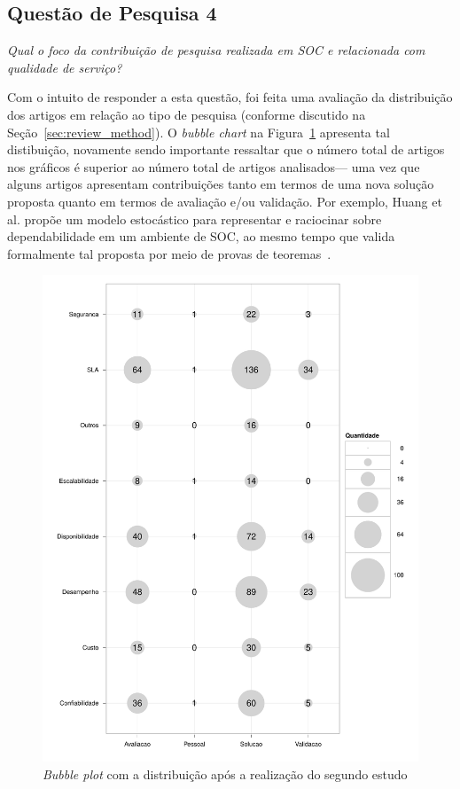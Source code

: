 \subsection{Questão de Pesquisa 4}

\emph{Qual o foco da contribuição de pesquisa realizada em SOC e relacionada com qualidade de serviço? }

Com o intuito de responder a esta questão, foi feita uma avalia\c c\~{a}o da distribui\c c\~{a}o dos 
artigos em rela\c c\~{a}o ao tipo de pesquisa (conforme discutido na Se\c c\~{a}o~\ref{sec:review_method}). 
O \emph{bubble chart} na Figura~\ref{fig:bubbleplot-QoSRes}  apresenta tal distibui\c c\~{a}o, novamente sendo importante ressaltar que o n\'{u}mero total de artigos nos gr\'{a}ficos \'{e} superior ao n\'{u}mero total de artigos analisados--- uma vez que alguns artigos apresentam contribui\c c\~{o}es tanto em termos de uma nova solu\c c\~{a}o proposta quanto em termos de avalia\c c\~{a}o e/ou valida\c c\~{a}o. Por exemplo, Huang et al. prop\~{o}e um modelo estoc\'{a}stico para representar e raciocinar sobre dependabilidade em um ambiente de SOC, ao mesmo tempo que valida formalmente tal proposta por meio de provas de teoremas~\cite{huang:scc2011}.

\begin{figure}[htb]
\centering
\includegraphics[scale=0.55]{imagens/pesquisaContexto.pdf}
\caption{\emph{Bubble plot} com a distribui\c{c}\~{a}o ap\'{o}s a realiza\c{c}\~{a}o do segundo estudo}
\label{fig:bubbleplot-QoSRes}
\end{figure}


